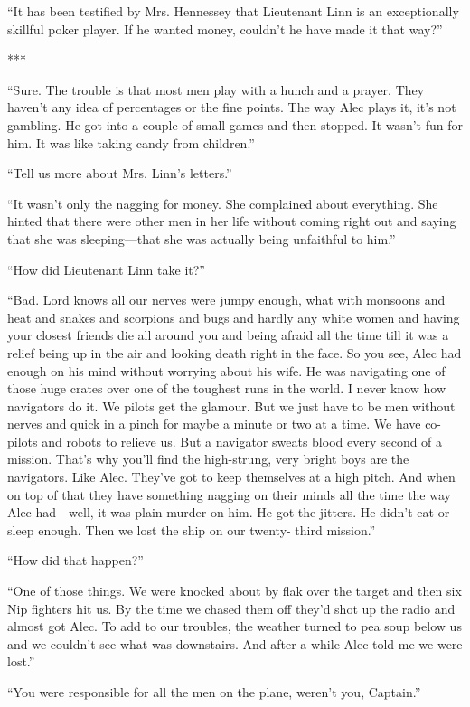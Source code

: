 {“It has been testified by Mrs. Hennessey that Lieutenant Linn is an exceptionally skillful poker player. If he wanted money, couldn’t he have made it that way?”

***

“Sure. The trouble is that most men play with a hunch and a prayer. They haven’t any idea of percentages or the fine points. The way Alec plays it, it’s not gambling. He got into a couple of small games and then stopped. It wasn’t fun for him. It was like taking candy from children.”

“Tell us more about Mrs. Linn’s letters.”

“It wasn’t only the nagging for money. She complained about everything. She hinted that there were other men in her life without coming right out and saying that she was sleeping—that she was actually being unfaithful to him.”

“How did Lieutenant Linn take it?”

“Bad. Lord knows all our nerves were jumpy enough, what with monsoons and heat and snakes and scorpions and bugs and hardly any white women and having your closest friends die all around you and being afraid all the time till it was a relief being up in the air and looking death right in the face. So you see, Alec had enough on his mind without worrying about his wife. He was navigating one of those huge crates over one of the toughest runs in the world. I never know how navigators do it. We pilots get the glamour. But we just have to be men without nerves and quick in a pinch for maybe a minute or two at a time. We have co-pilots and robots to relieve us. But a navigator sweats blood every second of a mission. That’s why you’ll find the high-strung, very bright boys are the navigators. Like Alec. They’ve got to keep themselves at a high pitch. And when on top of that they have something nagging on their minds all the time the way Alec had—well, it was plain murder on him. He got the jitters. He didn’t eat or sleep enough. Then we lost the ship on our twenty- third mission.”

“How did that happen?”

“One of those things. We were knocked about by flak over the target and then six Nip fighters hit us. By the time we chased them off they’d shot up the radio and almost got Alec. To add to our troubles, the weather turned to pea soup below us and we couldn’t see what was downstairs. And after a while Alec told me we were lost.”

“You were responsible for all the men on the plane, weren’t you, Captain.”

}
